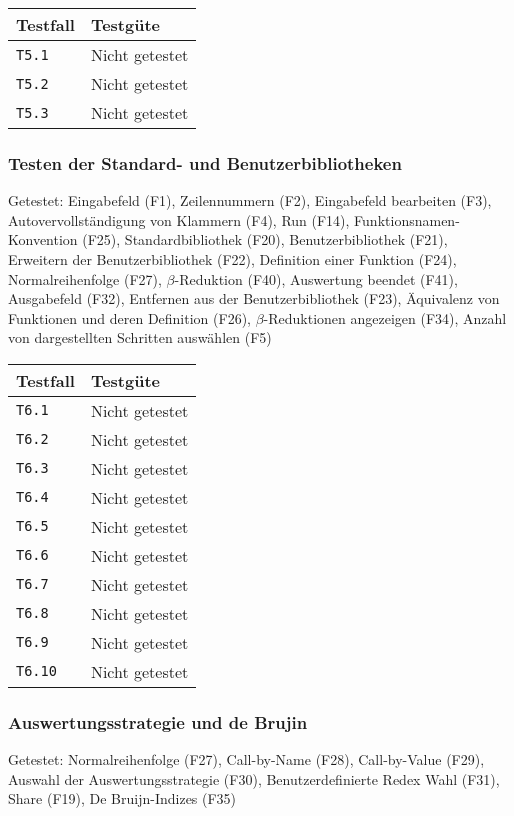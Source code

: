 \documentclass[parskip=full,11pt,twoside]{scrartcl}
\newcommand{\testline}[2]{
    \texttt{#1} & 
    \ifthenelse{\equal{#2}{Nicht getestet}}
        {\cellcolor{red!20}}
        {}
    \ifthenelse{\equal{#2}{Manuell getestet}}
        {\cellcolor{orange!20}}
        {}
    \ifthenelse{\equal{#2}{Automatisiert getestet}}
        {\cellcolor{green!20}}
        {}
    #2 \\ \hline
}
\begin{document}
    \label{shortcuts}
    \begin{center}
        \begin{tabular}{ p{9cm} p{4cm}}
            Testfall & Testgüte \\ \hline
            \testline{T5.1}{Nicht getestet}
            \testline{T5.2}{Nicht getestet}
            \testline{T5.3}{Nicht getestet}
        \end{tabular}
    \end{center}

\subsubsection{Testen der Standard- und Benutzerbibliotheken}
    Getestet:
    Eingabefeld (F1),
    Zeilennummern (F2),
    Eingabefeld bearbeiten (F3),
    Autovervollständigung von Klammern (F4),
    Run (F14),
    Funktionsnamen-Konvention (F25),
    Standardbibliothek (F20),
    Benutzerbibliothek (F21),
    Erweitern der Benutzerbibliothek (F22),
    Definition einer Funktion (F24),
    Normalreihenfolge (F27),
    $\beta$-Reduktion (F40),
    Auswertung beendet (F41),
    Ausgabefeld (F32),
    Entfernen aus der Benutzerbibliothek (F23),
    Äquivalenz von Funktionen und deren Definition (F26),
    $\beta$-Reduktionen angezeigen (F34),
    Anzahl von dargestellten Schritten auswählen (F5)

    \label{shortcuts}
    \begin{center}
        \begin{tabular}{ p{9cm} p{4cm}}
            Testfall & Testgüte \\ \hline
            \testline{T6.1}{Nicht getestet}
            \testline{T6.2}{Nicht getestet}
            \testline{T6.3}{Nicht getestet}
            \testline{T6.4}{Nicht getestet}
            \testline{T6.5}{Nicht getestet}
            \testline{T6.6}{Nicht getestet}
            \testline{T6.7}{Nicht getestet}
            \testline{T6.8}{Nicht getestet}
            \testline{T6.9}{Nicht getestet}
            \testline{T6.10}{Nicht getestet}
        \end{tabular}
    \end{center}

\subsubsection{Auswertungsstrategie und de Brujin}
    Getestet:
    Normalreihenfolge (F27),
    Call-by-Name (F28),
    Call-by-Value (F29),
    Auswahl der Auswertungsstrategie (F30),
    Benutzerdefinierte Redex Wahl (F31),
    Share (F19),
    De Bruijn-Indizes (F35)
\end{document}
